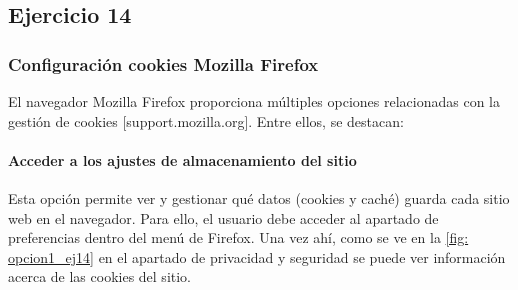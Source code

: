 \subsection{Ejercicio 14}
\graphicspath{ {img/14} }



\subsubsection{Configuración cookies Mozilla Firefox}

El navegador Mozilla Firefox proporciona múltiples opciones relacionadas con la gestión de cookies [support.mozilla.org]. Entre ellos, se destacan: 

\paragraph{Acceder a los ajustes de almacenamiento del sitio }

Esta opción permite ver y gestionar qué datos (cookies y caché) guarda cada sitio web en el navegador. Para ello, el usuario debe acceder al apartado de preferencias dentro del menú de Firefox. Una vez ahí, como se ve en la \ref{fig: opcion1_ej14} en el apartado de privacidad y seguridad se puede ver información acerca de las cookies del sitio. 

